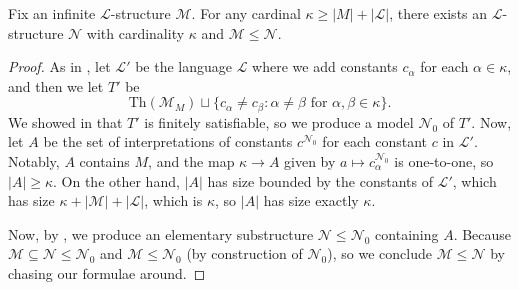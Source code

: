 \documentclass[../notes.tex]{subfiles}
\begin{document}
\begin{proposition}
	Fix an infinite $\mathcal L$-structure $\mathcal M$. For any cardinal $\kappa\ge\left|M\right|+\left|\mathcal L\right|$, there exists an $\mathcal L$-structure $\mathcal N$ with cardinality $\kappa$ and $\mathcal M\le\mathcal N$.
\end{proposition}
\begin{proof}
	As in , let $\mathcal L'$ be the language $\mathcal L$ where we add constants $c_\alpha$ for each $\alpha\in\kappa$, and then we let $T'$ be
	\[\mathrm{Th}(\mathcal M_M)\sqcup\{c_\alpha\ne c_\beta:\alpha\ne\beta\text{ for }\alpha,\beta\in\kappa\}.\]
	We showed in  that $T'$ is finitely satisfiable, so we produce a model $\mathcal N_0$ of $T'$. Now, let $A$ be the set of interpretations of constants $c^{\mathcal N_0}$ for each constant $c$ in $\mathcal L'$. Notably, $A$ contains $M$, and the map $\kappa\to A$ given by $a\mapsto c_\alpha^{\mathcal N_0}$ is one-to-one, so $\left|A\right|\ge\kappa$. On the other hand, $\left|A\right|$ has size bounded by the constants of $\mathcal L'$, which has size $\kappa+\left|\mathcal M\right|+\left|\mathcal L\right|$, which is $\kappa$, so $\left|A\right|$ has size exactly $\kappa$.

	Now, by , we produce an elementary substructure $\mathcal N\le\mathcal N_0$ containing $A$. Because $\mathcal M\subseteq\mathcal N\le\mathcal N_0$ and $\mathcal M\le\mathcal N_0$ (by construction of $\mathcal N_0$), so we conclude $\mathcal M\le\mathcal N$ by chasing our formulae around.
\end{proof}


\end{document}

